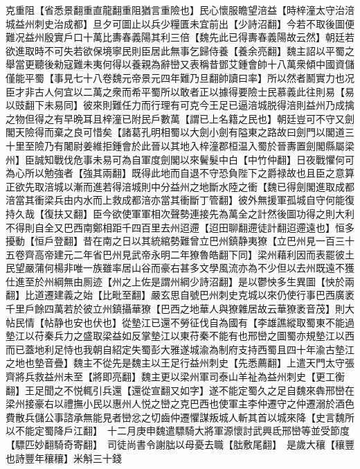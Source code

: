 克重阻【省悉景翻重直龍翻重阻猶言重險也】民心懷服瞻望涪益【時梓潼太守治涪城益州刺史治成都】旦夕可圖止以兵少糧匱未宜前出【少詩沼翻】今若不取後圖便難况益州殷實戶口十萬比夀春義陽其利三倍【魏先此已得夀春義陽故云然】朝廷若欲進取時不可失若欲保境寧民則臣居此無事乞歸侍養【養余亮翻】魏主詔以平蜀之舉當更聽後勑寇難未夷何得以養親為辭巒又表稱昔鄧艾鍾會帥十八萬衆傾中國資儲僅能平蜀【事見七十八卷魏元帝景元四年難乃旦翻帥讀曰率】所以然者鬭實力也况臣才非古人何宜以二萬之衆而希平蜀所以敢者正以據得要險士民慕義此往則易【易以豉翻下未易同】彼來則難任力而行理有可克今王足已逼涪城脱得涪則益州乃成擒之物但得之有早晩耳且梓潼已附民戶數萬【謂已上名籍之民也】朝廷豈可不守又劍閣天險得而棄之良可惜矣【諸葛孔明相蜀以大劍小劍有隘東之路故曰劍門以閣道三十里至險乃有闍尉姜維拒鍾會於此晉以其地入梓潼郡桓温入蜀於晉夀置劍閣縣屬梁州】臣誠知戰伐危事未易可為自軍度劍閣以來鬢髮中白【中竹仲翻】日夜戰懼何可為心所以勉強者【強其兩翻】既得此地而自退不守恐負陛下之爵禄故也且臣之意算正欲先取涪城以漸而進若得涪城則中分益州之地斷水陸之衝【魏已得劍閣進取成都涪當其衝梁兵由内水而上救成都涪亦當其衝斷丁管翻】彼外無援軍孤城自守何能復持久哉【復扶又翻】臣今欲使軍軍相次聲勢連接先為萬全之計然後圖功得之則大利不得則自全又巴西南鄭相距千四百里去州迢遰【迢田聊翻遰徒計翻迢遰遠也】恒多擾動【恒戶登翻】昔在南之日以其統綰勢難曾立巴州鎮静夷獠【立巴州見一百三十五卷齊高帝建元二年省巴州見武帝永明二年獠魯皓翻下同】梁州藉利因而表罷彼土民望嚴蒲何楊非唯一族雖率居山谷而豪右甚多文學風流亦為不少但以去州既遠不獲仕進至於州綱無由厠迹【州之上佐是謂州綱少詩沼翻】是以鬱怏多生異圖【怏於兩翻】比道遷建義之始【比毗至翻】嚴玄思自號巴州刺史克城以來仍使行事巴西廣袤千里戶餘四萬若於彼立州鎮攝華獠【巴西之地華人與獠雜居故云華獠袤音茂】則大帖民情【帖静也安也伏也】從墊江已還不勞征伐自為國有【李雄譙縱取蜀東不能過墊江以苻秦兵力之盛取梁益如反掌墊江以東苻秦不能有也邢巒之圖蜀亦規墊江以西而已蓋地利足恃也我朝自紹定失蜀彭大雅遂城渝為制府支持西蜀且四十年渝古墊江之地也墊音疊】魏主不從先是魏主以王足行益州刺史【先悉薦翻】上遣天門太守張齊將兵救益州未至【將即亮翻】魏主更以梁州軍司泰山羊祉為益州刺史【更工衡翻】王足聞之不悦輒引兵還【還從宣翻又如字】遂不能定蜀久之足自魏來犇邢巒在梁州接豪右以禮撫小民以惠州人悦之巒之克巴西也使軍主李仲遷守之仲遷溺於酒色費散兵儲公事諮承無能見者巒忿之切齒仲遷懼謀叛城人斬其首以城來降【史言魏所以不能定蜀降戶江翻】　十二月庚申魏遣驃騎大將軍源懷討武興氐邢巒等並受節度【驃匹妙翻騎奇寄翻】　司徒尚書令謝朏以母憂去職【朏敷尾翻】　是歲大穰【穰豐也詩豐年穰穰】米斛三十錢

